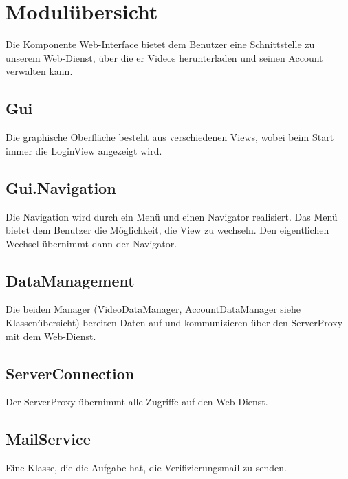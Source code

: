 \section{Modulübersicht} \label{interface:modul}
Die Komponente Web-Interface bietet dem Benutzer eine Schnittstelle zu unserem Web-Dienst, über die er Videos herunterladen und seinen Account verwalten kann. 

\subsection{Gui}
Die graphische Oberfläche besteht aus verschiedenen Views, wobei beim Start immer die LoginView angezeigt wird. 

\subsection{Gui.Navigation}
Die Navigation wird durch ein Menü und einen Navigator realisiert. Das Menü bietet dem Benutzer die Möglichkeit, die View zu wechseln. Den eigentlichen Wechsel übernimmt dann der Navigator.

\subsection{DataManagement}
Die beiden Manager (VideoDataManager, AccountDataManager siehe Klassenübersicht) bereiten Daten auf und kommunizieren über den ServerProxy mit dem Web-Dienst.

\subsection{ServerConnection}
Der ServerProxy übernimmt alle Zugriffe auf den Web-Dienst.

\subsection{MailService}
Eine Klasse, die die Aufgabe hat, die Verifizierungsmail zu senden.
\newpage

